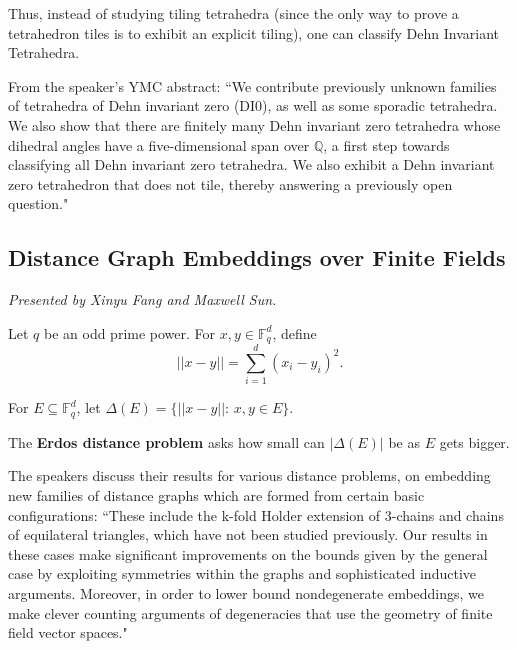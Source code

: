 \documentclass[12pt]{amsart}
\begin{document}
Thus, instead of studying tiling tetrahedra (since the only way to prove a tetrahedron tiles is to exhibit an explicit tiling), one can classify Dehn Invariant Tetrahedra.

\begin{result*}
From the speaker's YMC abstract:
``We contribute previously unknown families of tetrahedra of Dehn
invariant zero (DI0), as well as some sporadic tetrahedra. We also show that there are finitely
many Dehn invariant zero tetrahedra whose dihedral angles have a five-dimensional span over
$\mathbb{Q}$, a first step towards classifying all Dehn invariant zero tetrahedra. We also exhibit a Dehn
invariant zero tetrahedron that does not tile, thereby answering a previously open question."
\end{result*}

\newpage

\subsection{Distance Graph Embeddings over Finite Fields} 

\textit{}

\vspace{0.25cm}

\textit{Presented by Xinyu Fang and Maxwell Sun.}

\begin{definition}
Let $q$ be an odd prime power. For $x, y \in \mathbb{F}_q^d$, define \[ || x-y|| = \sum\limits_{i=1}^d (x_i - y_i)^2.\]

For $E \subseteq \mathbb{F}_q^d$, let $\Delta(E) = \{ || x-y||: \, x, y \in E\}.$
\end{definition}

The \textbf{Erdos distance problem} asks how small can $|\Delta(E)|$ be as $E$ gets bigger.

\begin{result*}The speakers discuss their results for various distance problems, on embedding new families of distance graphs which are formed from certain basic
configurations: ``These include the k-fold Holder extension of 3-chains and chains of equilateral
triangles, which have not been studied previously. Our results in these cases make significant
improvements on the bounds given by the general case by exploiting symmetries within the
graphs and sophisticated inductive arguments. Moreover, in order to lower bound nondegenerate embeddings, we make clever counting arguments of degeneracies that use the geometry
of finite field vector spaces."
\end{result*}
\end{document}
